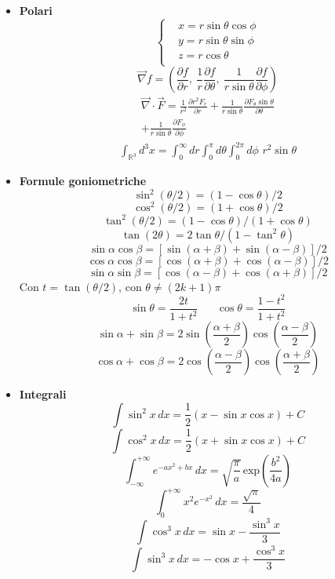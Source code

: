 \documentclass{article}
\begin{document}
\begin{small}
\begin{multicols*}{3}
\begin{itemize}[leftmargin=*]
	\item \textbf{Polari}
		\[
			\left\{\begin{aligned}
				&x= r\sin\theta \cos\phi\\ 
				&y= r\sin\theta \sin\phi \\
				&z= r\cos\theta \\
			\end{aligned}\right.
		\]
		\[\vec{\nabla} f = \left(\frac{\partial f}{\partial r},\ \frac{1}{r}\frac{\partial f}{\partial \theta },\ \frac{1}{r\sin\theta}\frac{\partial f}{\partial \phi }\right)\]
		\begin{align*}\vec{\nabla} \cdot \vec{F} = \frac{1}{r^2}\frac{\partial r^2F_r}{\partial r} + \frac{1}{r\sin\theta }\frac{\partial F_\theta \sin\theta }{\partial \theta }\\ + \frac{1}{r\sin\theta }\frac{\partial F_\phi }{\partial \phi }\end{align*}
		\begin{align*}\int_{\mathbb{R}^3}d^3x = \int_{0}^{\infty }dr \int_{0}^{\pi }d\theta  \int_{0}^{2\pi }d\phi \,\, r^2 \sin\theta \end{align*}

	\item \textbf{Formule goniometriche}
		\[\sin^2(\theta /2) = (1-\cos\theta )/2\]
		\[\cos^2(\theta /2) = (1+\cos\theta )/2\]
		\[\tan^2(\theta /2) = (1-\cos\theta )/(1+\cos\theta )\]
		\[\tan(2\theta ) = 2\tan\theta /(1-\tan^2\theta )\]
		\[\sin\alpha \cos\beta = [\sin(\alpha +\beta )+\sin(\alpha -\beta )]/2\]
		\[\cos\alpha \cos\beta = [\cos(\alpha +\beta )+\cos(\alpha -\beta )]/2\]
		\[\sin\alpha \sin\beta = [\cos(\alpha -\beta )+\cos(\alpha +\beta )]/2\]
		Con $t=\tan(\theta  /2)$, con $\theta \neq (2k+1)\pi $
		\[\sin\theta = \frac{2t}{1+t^2} \hspace{20pt}\cos\theta = \frac{1-t^2}{1+t^2}\]
		\[\sin\alpha +\sin\beta  = 2\sin\left(\frac{\alpha +\beta }{2}\right)\cos\left(\frac{\alpha -\beta }{2}\right)\]
		\[\cos\alpha +\cos\beta  = 2\cos\left(\frac{\alpha -\beta }{2}\right)\cos\left(\frac{\alpha +\beta }{2}\right)\]

	\item \textbf{Integrali}
		\[\int \sin^2 x \,dx = \frac{1}{2}(x-\sin x\cos x) + C\]
		\[\int \cos^2 x \,dx = \frac{1}{2}(x+\sin x\cos x) + C\]
		\[\int_{-\infty }^{+\infty } e^{-ax^2+bx}\,dx = \sqrt{\frac{\pi }{a}}\, \mathrm{exp}\left(\frac{b^2}{4a}\right)\]
		\[\int_{0}^{+\infty }x^2e^{-x^2}\,dx = \frac{\sqrt{\pi }}{4}\]
		\[\int \cos^3 x \,dx = \sin x - \frac{\sin^3 x}{3}\]
		\[\int \sin^3 x \,dx =-\cos x + \frac{\cos^3 x}{3}\]


\end{itemize}
\end{multicols*}
\end{small}
\end{document}
